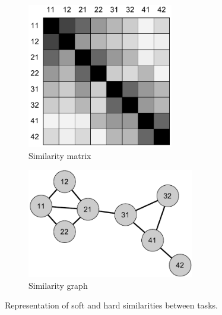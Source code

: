 \begin{figure}[htb]
\centering
\begin{subfigure}[t]{.48\textwidth}
\centering
\includegraphics[width=0.7\textwidth]{img/similarity-matrix}
\caption{Similarity matrix}
\end{subfigure}
\begin{subfigure}[t]{.48\textwidth}
\centering
\includegraphics[width=0.8\textwidth]{img/similarity-graph}
\caption{Similarity graph}
\end{subfigure}
\caption{%
  Representation of soft and hard similarities between tasks.}
\label{fig:similarities-tasks}
\end{figure}


